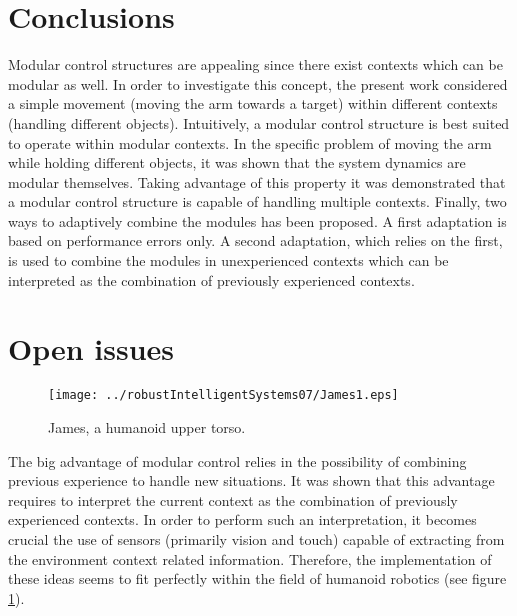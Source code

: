 \documentclass{svmult}
\begin{document}

\section{Conclusions}

Modular control structures are appealing since there exist contexts
which can be modular as well. In order to investigate this concept,
the present work considered a simple movement (moving the arm towards a target)
within different contexts (handling different objects). Intuitively,
a modular control structure is best suited to operate within modular
contexts. In the specific problem of moving the arm while holding
different objects, it was shown that the system dynamics are
modular themselves. Taking advantage of this property it was demonstrated
that a modular control structure is capable of handling multiple
contexts. Finally, two ways to adaptively combine the modules has
been proposed. A first adaptation is based on performance errors
only. A second adaptation, which relies on the first, is used to
combine the modules in unexperienced contexts which can be
interpreted as the combination of previously experienced contexts.

\section{Open issues}

\begin{figure}
	\centering
		\texttt{[image: ../robustIntelligentSystems07/James1.eps]}
		\caption{James, a humanoid upper torso.}
	\label{fig:James1}
\end{figure}

The big advantage of modular control relies in the possibility
of combining previous experience to handle new situations. It was shown
that this advantage requires to interpret the current
context as the combination of previously experienced contexts.
In order to perform such an interpretation, it becomes crucial the 
use of sensors (primarily vision and touch) capable of extracting 
from the environment context related information. Therefore, the
implementation of these ideas seems to fit perfectly within
the field of humanoid robotics (see figure \ref{fig:James1}). 
\end{document}
